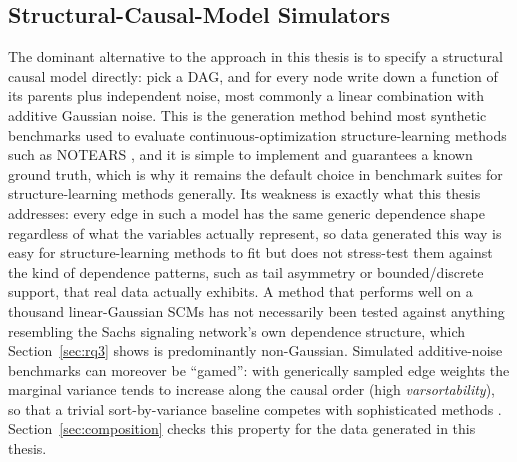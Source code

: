 \documentclass[
  english,
  class=report,
  accentcolor=2c,
  marginpar=false,
  parskip=half-,
  fontsize=11pt,
  ruledheaders=false,
  pdfa=false,
  IMRAD=false,
  thesis={type=master}
]{tudapub}
\begin{document}
\subsection{Structural-Causal-Model Simulators}
The dominant alternative to the approach in this thesis is to specify a
structural causal model directly: pick a DAG, and for every node write down a
function of its parents plus independent noise, most commonly a linear
combination with additive Gaussian noise. This is the generation method
behind most synthetic benchmarks used to evaluate continuous-optimization
structure-learning methods such as NOTEARS \parencite{zheng2018}, and it is
simple to implement and guarantees a known ground truth, which is why it
remains the default choice in benchmark suites for structure-learning
methods generally. Its weakness is exactly what this thesis addresses: every
edge in such a model has the same generic dependence shape regardless of
what the variables actually represent, so data generated this way is easy
for structure-learning methods to fit but does not stress-test them against
the kind of dependence patterns, such as tail asymmetry or bounded/discrete
support, that real data actually exhibits. A method that performs well on a
thousand linear-Gaussian SCMs has not necessarily been tested against
anything resembling the Sachs signaling network's own dependence structure,
which Section~\ref{sec:rq3} shows is predominantly non-Gaussian. Simulated
additive-noise benchmarks can moreover be ``gamed'': with generically
sampled edge weights the marginal variance tends to increase along the
causal order (high \emph{varsortability}), so that a trivial
sort-by-variance baseline competes with sophisticated methods
\parencite{reisach2021}. Section~\ref{sec:composition} checks this property
for the data generated in this thesis.
\end{document}
